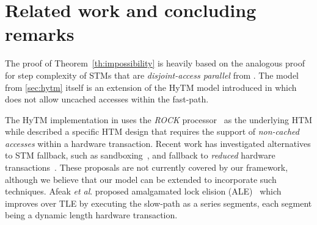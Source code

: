 \section{Related work and concluding remarks}
\label{sec:rel}
%
The proof of Theorem~\ref{th:impossibility} is heavily based on the analogous proof for step complexity of
STMs that are \emph{disjoint-access parallel} from \cite{prog15-pact}.
The model from \cref{sec:hytm} itself is an extension of the HyTM model introduced in \cite{hytm14disc}
which does not allow uncached accesses within the fast-path.

The HyTM implementation in \cite{damronhytm} uses the \emph{ROCK} processor~\cite{rock} as the underlying HTM
while \cite{kumarhytm} described a specific HTM design that requires the support of \emph{non-cached accesses}
within a hardware transaction. 
Recent work has investigated alternatives to STM fallback, such as sandboxing~\cite{ALM14,CTGM14}, and fallback to \emph{reduced} hardware transactions~\cite{MS13}. These proposals are not currently covered by our framework, although we believe that our model can be extended to incorporate such techniques.
Afeak \emph{et al}. proposed amalgamated lock elision (ALE)~\cite{ale15} which improves over TLE
by executing the slow-path as a series segments, each segment being a dynamic length hardware transaction.
